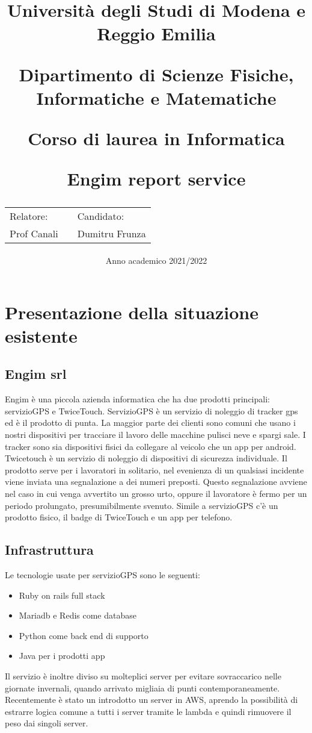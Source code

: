 \documentclass[12pt]{article}
\author{}
\title{
    \huge 
        \textbf{Università degli Studi di Modena e Reggio Emilia}
    \large
        \par Dipartimento di Scienze Fisiche, Informatiche e Matematiche
        \par Corso di laurea in Informatica
    \vfil
        \huge \par \textbf{Engim report service}
    \vfil
    \normalsize
    \begin{tabular}{lp{0.5\textwidth}l}
      Relatore: & & Candidato: \\
      Prof Canali & &  Dumitru Frunza \\
      \end{tabular}
}
\date{Anno academico 2021/2022}
\begin{document}
\maketitle
\section{Presentazione della situazione esistente}
\subsection{Engim srl}
Engim è una piccola azienda informatica che ha due prodotti principali: servizioGPS e TwiceTouch.
ServizioGPS è un servizio di noleggio di tracker gps ed è il prodotto di punta.
La maggior parte dei clienti sono comuni che usano i nostri dispositivi per tracciare il
lavoro delle macchine pulisci neve e spargi sale.
I tracker sono sia dispositivi fisici da collegare al veicolo che un app per
android.
\newline Twicetouch è un servizio di noleggio di dispositivi di sicurezza individuale.
Il prodotto serve per i lavoratori in solitario, nel evenienza di un qualsiasi
incidente viene inviata una segnalazione a dei numeri preposti. Questo segnalazione
avviene nel caso in cui venga avvertito un grosso urto, oppure il lavoratore è
fermo per un periodo prolungato, presumibilmente svenuto. Simile a servizioGPS c'è
un prodotto fisico, il badge di TwiceTouch e un app per telefono.

\subsection{Infrastruttura}
Le tecnologie usate per servizioGPS sono le seguenti:
\begin{itemize}
  \item Ruby on rails full stack
  \item Mariadb e Redis come database
  \item Python come back end di supporto
  \item Java per i prodotti app
\end{itemize}
Il servizio è inoltre diviso su molteplici server per evitare sovraccarico nelle
giornate invernali, quando arrivato migliaia di punti contemporaneamente.
Recentemente è stato un introdotto un server in AWS, aprendo la possibilità di
estrarre logica comune a tutti i server tramite le lambda e quindi rimuovere il
peso dai singoli server.
\end{document}
